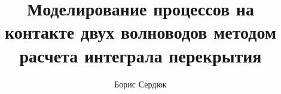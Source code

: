 \thispagestyle{empty}			

\title{Моделирование процессов на контакте двух волноводов методом расчета интеграла перекрытия}
\author{Борис Сердюк}
\maketitle

\newpage
